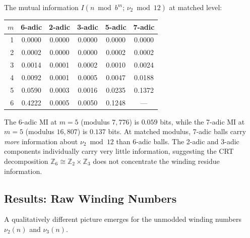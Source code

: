 \documentclass[11pt,a4paper]{article}
\newcommand{\Z}{\mathbb{Z}}
\theoremstyle{plain}
\theoremstyle{definition}
\begin{document}
\begin{empirical}
\label{obs:sixadic-mi}
    The mutual information $I(n \bmod b^m;\, \nu_2 \bmod 12)$ at
    matched level:
    \begin{center}
    \renewcommand{\arraystretch}{1.15}
    \small\setlength{\tabcolsep}{4pt}
    \begin{tabular}{rccccc}
        \toprule
        $m$ & 6-adic & 2-adic & 3-adic & 5-adic & 7-adic \\
        \midrule
        1 & 0.0000 & 0.0000 & 0.0000 & 0.0000 & 0.0000 \\
        2 & 0.0002 & 0.0000 & 0.0000 & 0.0002 & 0.0002 \\
        3 & 0.0014 & 0.0001 & 0.0002 & 0.0010 & 0.0024 \\
        4 & 0.0092 & 0.0001 & 0.0005 & 0.0047 & 0.0188 \\
        5 & 0.0590 & 0.0003 & 0.0016 & 0.0235 & 0.1372 \\
        6 & 0.4222 & 0.0005 & 0.0050 & 0.1248 & --- \\
        \bottomrule
    \end{tabular}
    \end{center}
    The 6-adic MI at $m = 5$ (modulus $7{,}776$) is $0.059$ bits, while
    the 7-adic MI at $m = 5$ (modulus $16{,}807$) is $0.137$ bits.
    At matched modulus, 7-adic balls carry \emph{more} information about
    $\nu_2 \bmod 12$ than 6-adic balls.  The 2-adic and 3-adic
    components individually carry very little information, suggesting
    the CRT decomposition $\Z_6 \cong \Z_2 \times \Z_3$ does not
    concentrate the winding residue information.
\end{empirical}


\subsection{Results: Raw Winding Numbers}

A qualitatively different picture emerges for the unmodded winding
numbers $\nu_2(n)$ and $\nu_3(n)$.
\end{document}
